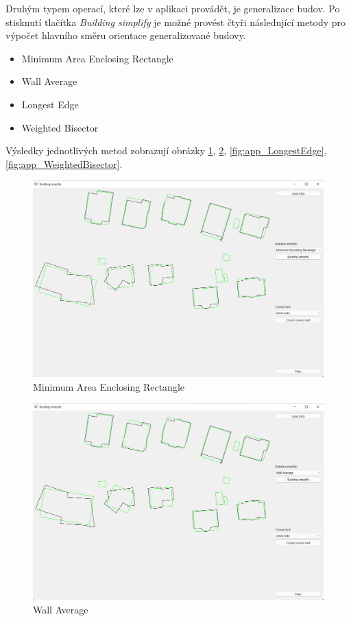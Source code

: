 \documentclass[11pt]{article}
\begin{document}
	Druhým typem operací, které lze v aplikaci provádět, je generalizace budov. Po stisknutí tlačítka \textit{Building simplify} je možné provést čtyři následující metody pro výpočet hlavního směru orientace generalizované budovy.
	
	\begin{itemize}
		\item Minimum Area Enclosing Rectangle 
		\item Wall Average 
		\item Longest Edge
		\item Weighted Bisector 
	\end{itemize}
	
	Výsledky jednotlivých metod zobrazují obrázky \ref{fig:app_MAER}, \ref{fig:app_WallAverage}, \ref{fig:app_LongestEdge}, \ref{fig:app_WeightedBisector}.
	\begin{figure}[htbh]
		\centering
		\includegraphics[scale=0.39]{images/U2_aplikace_MAER2.png} 
		\caption{Minimum Area Enclosing Rectangle}
		\label{fig:app_MAER}
	\end{figure} 
	\begin{figure}[htbh]
		\centering
		\includegraphics[scale=0.39]{images/U2_aplikace_WallAvarage2.png} 
		\caption{Wall Average}
		\label{fig:app_WallAverage}
	\end{figure} 
\end{document}
